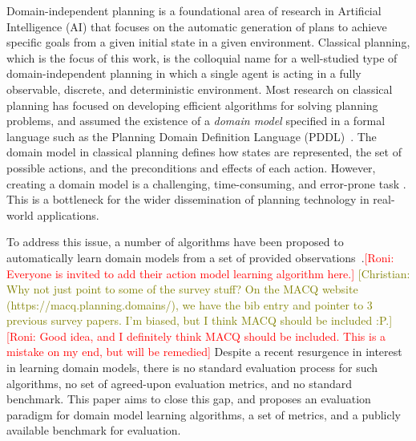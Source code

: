 \documentclass{article}
\theoremstyle{definition}
\theoremstyle{remark}
\newcommand{\roni}[1]{{\textcolor{red}{[Roni: #1]}}}
\newcommand{\cm}[1]{{\textcolor{olive}{[Christian: #1]}}}
\begin{document}
Domain-independent planning is a foundational area of research in Artificial Intelligence (AI) that focuses on the automatic generation of plans to achieve specific goals from a given initial state in a given environment. Classical planning, which is the focus of this work, is the colloquial name for a well-studied type of domain-independent planning in which a single agent is acting in a fully observable, discrete, and deterministic environment. 
Most research on classical planning has focused on developing efficient algorithms for solving planning problems, and assumed the existence of a \emph{domain model} specified in a formal language such as the Planning Domain Definition Language (PDDL)~\citep{haslum2019introduction}. 
The domain model in classical planning defines how states are represented, the set of possible actions, and the preconditions and effects of each action. 
However, creating a domain model is a challenging, time-consuming, and error-prone task \citep{DBLP:conf/kcap/McCluskeyVV17}.
This is a bottleneck for the wider dissemination of planning technology in real-world applications. 

To address this issue, a number of algorithms have been proposed to automatically learn domain models from a set of provided observations~\citep{gösgens2025learningfromonlyactiontraces,LAMANNA2025104256,xi2024neuro,mordoch2024safe,juba2021safe,lamanna2021online,cresswell2011generalised,ZHUO20101540}.\roni{Everyone is invited to add their action model learning algorithm here.}
\cm{Why not just point to some of the survey stuff? On the MACQ website (https://macq.planning.domains/), we have the bib entry and pointer to 3 previous survey papers. I'm biased, but I think MACQ should be included :P.}
\roni{Good idea, and I definitely think MACQ should be included. This is a mistake on my end, but will be remedied}
Despite a recent resurgence in interest in learning domain models, there is no standard evaluation process for such algorithms, 
no set of agreed-upon evaluation metrics, and no standard benchmark. 
This paper aims to close this gap, and proposes an evaluation paradigm for domain model learning algorithms, a set of metrics, and a publicly available benchmark for evaluation. 
\end{document}
